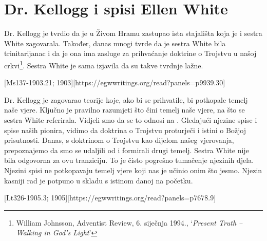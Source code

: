 \chapter{Dr. Kellogg i spisi Ellen White}

Dr. Kellogg je tvrdio da je u Živom Hramu zastupao ista stajališta koja je i sestra White zagovarala. Također, danas mnogi tvrde da je sestra White bila trinitarijanac i da je ona ima zasluge za prihvaćanje doktrine o Trojstvu u našoj crkvi\footnote{William Johnsson, Adventist Review, 6. siječnja 1994., ‘\textit{Present Truth –Walking in God's Light}’}. Sestra White je sama izjavila da su takve tvrdnje lažne.

[Ms137-1903.21; 1903][https://egwwritings.org/read?panels=p9939.30]

Dr. Kellogg je zagovarao teorije koje, ako bi se prihvatile, bi potkopale temelj naše vjere. Ključno je pravilno razumjeti što čini temelj naše vjere, na što se sestra White referirala. Vidjeli smo da se to odnosi na . Gledajući njezine spise i spise naših pionira, vidimo da doktrina o Trojstvu proturječi  i istini o Božjoj prisutnosti. Danas, s doktrinom o Trojstvu kao dijelom našeg vjerovanja, prepoznajemo da smo se udaljili od  i formirali drugi temelj. Sestra White nije bila odgovorna za ovu tranziciju. To je čisto pogrešno tumačenje njezinih djela. Njezini spisi ne potkopavaju temelj vjere koji nas je učinio onim što jesmo. Njezin kasniji rad je potpuno u skladu s istinom danoj na početku.

[Lt326-1905.3; 1905][https://egwwritings.org/read?panels=p7678.9]

